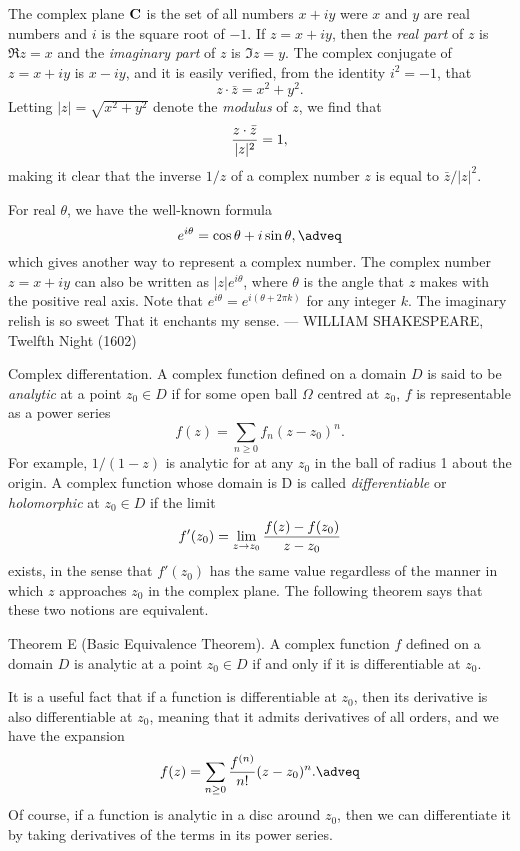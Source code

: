 The complex plane ${\bf C}$ is the set of all numbers $x + iy$ were $x$ and $y$ are real numbers and $i$
is the square root of $-1$. If $z = x + iy$, then the {\it real part} of $z$ is $\Re z = x$ and the
{\it imaginary part} of $z$ is $\Im z = y$. The complex conjugate of $z = x + iy$ is $x-iy$, and it is
easily verified, from the identity $i^2 = -1$, that
$$z\cdot \bar z = x^2 + y^2.$$
Letting $|z| = \sqrt{x^2 + y^2}$ denote the {\it modulus} of $z$, we find that
$${z\cdot \bar z\over |z|^2} = 1,$$
making it clear that the inverse $1/z$ of a complex number $z$ is equal to $\bar z / |z|^2$.

For real $\theta$, we have the well-known formula
$$e^{i\theta} = \cos \theta + i\sin \theta,\adveq$$
which gives another way to represent a complex number. The complex number $z = x+iy$ can also be written
as $|z|e^{i\theta}$, where $\theta$ is the angle that $z$ makes with the positive real axis.
Note that $e^{i\theta} = e^{i(\theta + 2\pi k)}$ for any integer $k$.
\bigskip
{\obeylines\eightssi
\hfill The imaginary relish is so sweet
\hfill That it enchants my sense.
\eightss
\smallskip
\hfill --- WILLIAM SHAKESPEARE, {\eightssi Twelfth Night} (1602)}
\bigskip

\boldlabel Complex differentation. A complex function defined on a domain $D$
is said to be {\it analytic} at a point $z_0\in D$ if for some open ball $\Omega$ centred at
$z_0$, $f$ is representable as a power series
$$f(z) = \sum_{n\geq 0} f_n(z-z_0)^n.$$
For example, $1/(1-z)$ is analytic for at any $z_0$ in the ball of radius 1 about the origin.
A complex function whose domain is D
is called {\it differentiable} or {\it holomorphic} at $z_0\in D$ if the limit
$$f'(z_0) = \lim_{z\to z_0} {f(z) - f(z_0) \over z- z_0} $$
exists, in the sense that $f'(z_0)$ has the same value regardless of the manner in which $z$ approaches
$z_0$ in the complex plane. The following theorem says that these two notions are equivalent.

\parenproclaim Theorem E (Basic Equivalence Theorem). A complex function $f$ defined on a domain
$D$ is analytic at a point $z_0\in D$ if and only if it is differentiable at $z_0$.\slug

It is a useful fact that if a function is differentiable at $z_0$,
then its derivative is also differentiable at $z_0$, meaning
that it admits derivatives of all orders, and we have the expansion
$$f(z) = \sum_{n\geq 0} {f^{(n)} \over n!} (z-z_0)^n.\adveq$$
Of course, if a function is analytic in a disc around $z_0$, then we can
differentiate it by taking derivatives of the terms in its power series.
\medskip


